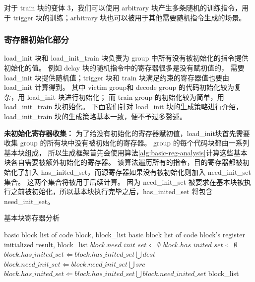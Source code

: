 对于 train 块的变体 3，我们可以使用 arbitrary 块产生多条随机的训练指令，用于 trigger 块的训练；arbitrary 块也可以被用于其他需要随机指令生成的场景。\par

\subsubsection{寄存器初始化部分}

load\_init 块和 load\_init\_train 块负责为 group 中所有没有被初始化的指令提供初始化的值。
例如 delay 块的随机指令中的寄存器很多是没有赋初值的，
需要 load\_init 块提供随机值；trigger 块和 train 块满足约束的寄存器值也要由 load\_init 计算得到。
其中 victim group和 decode group 的代码初始化较为复杂，用 load\_init 块进行初始化；
而 train group 的初始化较为简单，用 load\_init\_train 块初始化。
下面我们针对 load\_init 块的生成策略进行介绍，load\_init\_train 块的生成策略基本一致，便不予过多赘述。\par

\textbf{未初始化寄存器收集：}
为了给没有初始化的寄存器赋初值，load\_init块首先需要收集 group 的所有块中没有被初始化的寄存器。
group 的每个代码块都由一系列基本块组成，
所以生成框架首先会使用算法\ref{alg:basic-reg-analysis}计算这些基本块各自需要被额外初始化的寄存器。
该算法遍历所有的指令，目的寄存器都被初始化了加入 has\_inited\_set，而源寄存器如果没有被初始化则加入 need\_init\_set 集合。
这两个集合将被用于后续计算。
因为 need\_init\_set 被要求在基本块被执行之前被初始化，所以基本块执行完毕之后，has\_inited\_set 将包含  need\_init\_set。 \par

\begin{algorithm}[!h]
    
    \caption{基本块寄存器分析}
    \label{alg:basic-reg-analysis}
    \renewcommand{\algorithmicrequire}{\textbf{Input:}}
    \renewcommand{\algorithmicensure}{\textbf{Output:}}
    
    \begin{algorithmic}[1]
        \REQUIRE basic block list of code block, block\_list  %
        \ENSURE  basic block list of code block's register initialized result, block\_list  %
            \STATE $block.need\_init\_set \Leftarrow \emptyset$
            \STATE $block.has\_inited\_set \Leftarrow \emptyset$
                    \STATE $block.has\_inited\_set \Leftarrow block.has\_inited\_set \bigcup dest$
                \ENDFOR
                        \STATE $block.need\_init\_set \Leftarrow block.need\_init\_set \bigcup src$
                    \ENDIF
                \ENDFOR
            \ENDFOR
            \STATE $block.has\_inited\_set \Leftarrow block.has\_inited\_set \bigcup block.need\_inited\_set$
        \ENDFOR
        \RETURN block\_list
    \end{algorithmic}
\end{algorithm}

